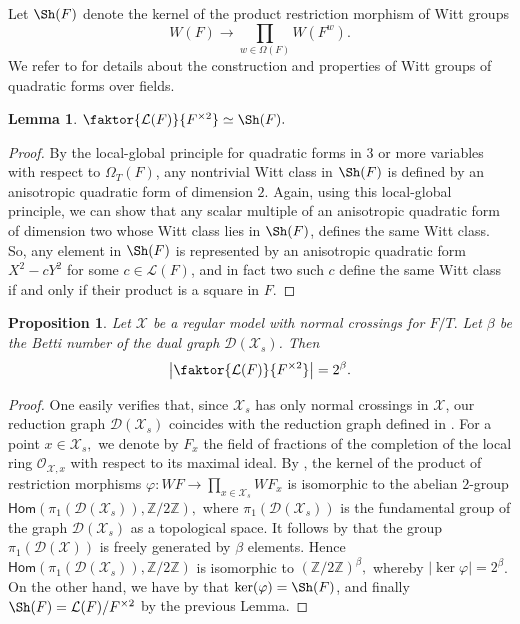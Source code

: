 \documentclass[a4paper,12pt,reqno]{amsart}
\newcommand\mc\mathcal
\newtheorem{lem}[thm]{Lemma}
\newtheorem{prop}[thm]{Proposition}
\theoremstyle{definition}
\numberwithin{equation}{thm}
\begin{document}
\smallskip
\noindent 
Let $\Sh(F)$ denote the kernel of the product restriction morphism of Witt groups
$$W(F) \to \prod_{w \in \Omega(F)} W(F^w).$$
We refer to \cite{Lam} for details about the construction and properties of Witt groups of quadratic forms over fields.


\begin{lem}\label{radicalker} 
$\faktor{\mathcal{L}(F)}{F^{\times 2}}\simeq \Sh(F).$
\end{lem}
\begin{proof}  
By the local-global principle for quadratic forms in $3$ or more variables with respect to $\Omega_T(F)$, any nontrivial Witt class in $\Sh(F)$ is defined by an anisotropic quadratic form of dimension $2$. Again, using this local-global principle, we can show that any scalar multiple of an anisotropic quadratic form of dimension two whose Witt class lies in $\Sh(F)$, defines the same Witt class.
So, any element in $\Sh(F)$ is represented by an anisotropic quadratic form $X^2 - c Y^2$ for some $c \in \mathcal{L}(F)$, and in fact two such $c$ define the same Witt class if and only if their product is a square in $F$.
\end{proof}

\begin{prop}\label{HHKbetti} Let $\mc{X}$ be a regular model with normal crossings for $F/T.$ Let $\beta$ be the Betti number of the dual graph $\mc{D}(\mc{X}_s)$. Then $$\left\vert \faktor{\mathcal{L}(F)}{F^{\times 2}} \right\vert =2^{\beta}.$$
\end{prop}
\begin{proof} 
One easily verifies that, since $\mc{X}_s$ has only normal crossings in $\mc{X}$, our reduction graph $\mathcal{D}(\mc{X}_s)$ coincides with the reduction graph defined in \cite{HHK15}.
For a point $x\in\mc{X}_{s},$ we denote by $F_{x}$ the field of fractions of the completion of the local ring $\mathcal{O}_{\mc{X},x}$ with respect to its maximal ideal. By \cite[Theorem 9.6]{HHK15}, the kernel of the product of restriction morphisms $\varphi: WF\rightarrow\displaystyle\prod_{x\in \mc{X}_{s}} WF_{x}$ is isomorphic to the abelian $2$-group $\mathsf{Hom}(\pi_{1}(\mc{D}(\mc{X}_s)),\mathbb{Z}/2\mathbb{Z}),$ where $\pi_{1}(\mc{D}(\mc{X}_s))$ is the fundamental group of the graph $\mc{D}(\mc{X}_s)$ as a topological space. It follows by \cite[Proposition 1A.1 and Proposition 1A.2]{Ha00} that the group $\pi_{1}(\mc{D}(\mc{X}))$ is freely generated by $\beta$ elements. Hence $\mathsf{Hom}(\pi_{1}(\mc{D}(\mc{X}_s)),\mathbb{Z}/2\mathbb{Z})$ is isomorphic to $(\mathbb{Z}/2\mathbb{Z})^{\beta},$ whereby $\vert \ker\varphi \vert = 2^\beta$. On the other hand, we have by \cite[Proposition 9.11 (c)]{HHK15} that $\ker(\varphi) = \Sh(F)$, and finally $\Sh(F)=\mathcal{L}(F)/F^{\times 2}$ by the previous Lemma. 
\end{proof}
\end{document}
